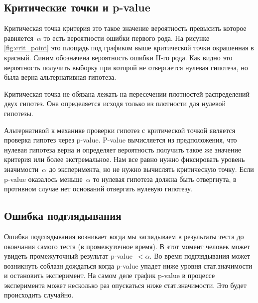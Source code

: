 \documentclass[../handbook.tex]{subfiles}
\begin{document}
\subsection{Критические точки и p-value}
Критическая точка критерия это такое значение вероятность превысить которое
равняется~$\alpha$ то есть вероятности ошибки первого рода. На рисунке
\ref{fig:crit_point} это площадь под графиком выше критической точки окрашенная
в красный. Синим обозначена вероятность ошибки II-го рода. Как видно это
вероятность получить выборку при которой не отвергается нулевая гипотеза, но
была верна альтернативная гипотеза.

Критическая точка не обязана лежать на пересечении плотностей распределений
двух гипотез. Она определяется исходя только из плотности для нулевой гипотезы.

Альтернативой к механике проверки гипотез с критической точкой является
проверка гипотез через p-value. P-value вычисляется из предположения, что
нулевая гипотеза верна и определяет вероятность получить такое же значение
критерия или более экстремальное. Нам все равно нужно фиксировать уровень
значимости~$\alpha$ до эксперимента, но не нужно вычислять критическую точку.
Если p-value оказалось меньше~$\alpha$ то нулевая гипотеза должна быть
отвергнута, в противном случае нет оснований отвергать нулевую гипотезу.

\subsection{Ошибка подглядывания}
Ошибка подглядывания возникает когда мы заглядываем в результаты теста до
окончания самого теста (в промежуточное время). В этот момент человек может
увидеть промежуточный результат p-value~$< \alpha$. Во время подглядывания
может возникнуть соблазн дождаться когда p-value упадет ниже уровня
стат.значимости и остановить эксперимент. На самом деле график p-value в
процессе эксперимента может несколько раз опускаться ниже стат.значимости. Это
будет происходить случайно.
\end{document}
